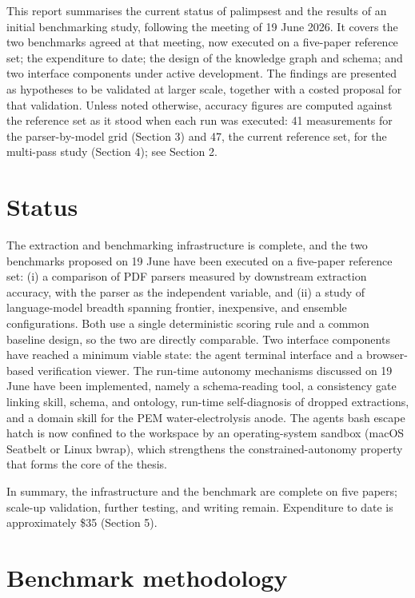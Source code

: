 This report summarises the current status of palimpsest and the results
of an initial benchmarking study, following the meeting of 19 June 2026.
It covers the two benchmarks agreed at that meeting, now executed on a
five-paper reference set; the expenditure to date; the design of the
knowledge graph and schema; and two interface components under active
development. The findings are presented as hypotheses to be validated at
larger scale, together with a costed proposal for that validation.
Unless noted otherwise, accuracy figures are computed against the
reference set as it stood when each run was executed: 41 measurements
for the parser-by-model grid (Section 3) and 47, the current reference
set, for the multi-pass study (Section 4); see Section 2.

\section{Status}\label{status}

The extraction and benchmarking infrastructure is complete, and the two
benchmarks proposed on 19 June have been executed on a five-paper
reference set: (i) a comparison of PDF parsers measured by downstream
extraction accuracy, with the parser as the independent variable, and
(ii) a study of language-model breadth spanning frontier, inexpensive,
and ensemble configurations. Both use a single deterministic scoring
rule and a common baseline design, so the two are directly comparable.
Two interface components have reached a minimum viable state: the agent
terminal interface and a browser-based verification viewer. The run-time
autonomy mechanisms discussed on 19 June have been implemented, namely a
schema-reading tool, a consistency gate linking skill, schema, and
ontology, run-time self-diagnosis of dropped extractions, and a domain
skill for the PEM water-electrolysis anode. The agent\textquotesingle s
bash escape hatch is now confined to the workspace by an
operating-system sandbox (macOS Seatbelt or Linux bwrap), which
strengthens the constrained-autonomy property that forms the core of the
thesis.

In summary, the infrastructure and the benchmark are complete on five
papers; scale-up validation, further testing, and writing remain.
Expenditure to date is approximately \$35 (Section 5).

\section{Benchmark methodology}\label{benchmark-methodology}

